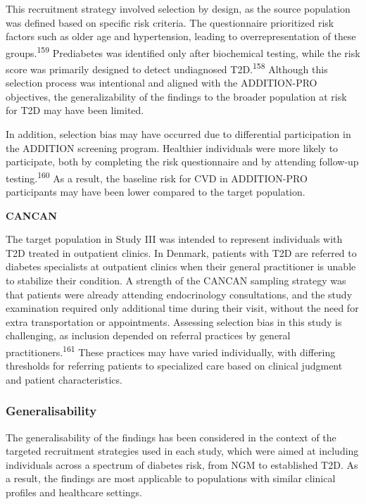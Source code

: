 \documentclass[
  a4paper,
  headsepline=true,
  open=any]{scrbook}
\begin{document}
This recruitment strategy involved selection by design, as the source
population was defined based on specific risk criteria. The
questionnaire prioritized risk factors such as older age and
hypertension, leading to overrepresentation of these
groups.\textsuperscript{159} Prediabetes was identified only after
biochemical testing, while the risk score was primarily designed to
detect undiagnosed T2D.\textsuperscript{158} Although this selection
process was intentional and aligned with the ADDITION-PRO objectives,
the generalizability of the findings to the broader population at risk
for T2D may have been limited.

In addition, selection bias may have occurred due to differential
participation in the ADDITION screening program. Healthier individuals
were more likely to participate, both by completing the risk
questionnaire and by attending follow-up testing.\textsuperscript{160}
As a result, the baseline risk for CVD in ADDITION-PRO participants may
have been lower compared to the target population.

\textbf{CANCAN}

The target population in Study III was intended to represent individuals
with T2D treated in outpatient clinics. In Denmark, patients with T2D
are referred to diabetes specialists at outpatient clinics when their
general practitioner is unable to stabilize their condition. A strength
of the CANCAN sampling strategy was that patients were already attending
endocrinology consultations, and the study examination required only
additional time during their visit, without the need for extra
transportation or appointments. Assessing selection bias in this study
is challenging, as inclusion depended on referral practices by general
practitioners.\textsuperscript{161} These practices may have varied
individually, with differing thresholds for referring patients to
specialized care based on clinical judgment and patient characteristics.

\hypertarget{generalisability}{%
\subsubsection{Generalisability}\label{generalisability}}

The generalisability of the findings has been considered in the context
of the targeted recruitment strategies used in each study, which were
aimed at including individuals across a spectrum of diabetes risk, from
NGM to established T2D. As a result, the findings are most applicable to
populations with similar clinical profiles and healthcare settings.
\end{document}
